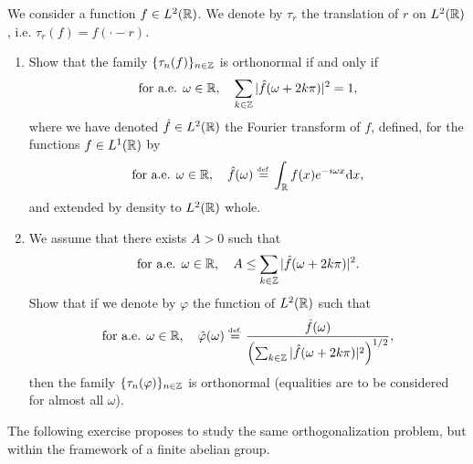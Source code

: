 \begin{exo}
\label{exo-series-fourier-orthogonalisation}

  We consider a function $ f \in L^2(\mathbb{R})$. We denote by $\tau_r $ the translation of $ r $ on $L^2(\mathbb{R})$, i.e. $\tau_r (f) = f(\cdot-r)$. \begin{enumerate}
\item Show that the family $\{\tau_n (f)\}_{n \in\mathbb{Z}}$ is orthonormal if and only if
\begin{equation*}
\text{for a.e. } \omega \in \mathbb{R}, \quad \sum_{k \in\mathbb{Z}}{|\hat{f}(\omega + 2k \pi) |^2} = 1,
\end{equation*}
where we have denoted $\hat{f} \in L^2(\mathbb{R})$ the Fourier transform of $f$, defined, for the functions $ f \in L^1(\mathbb{R})$ by
\begin{equation*}
\text{for a.e. } \omega \in \mathbb{R}, \quad \hat{f}(\omega) \stackrel{\mbox{\upshape\tiny def.}}{=} \int_{\mathbb{R}}{f (x) e^{- \imath \omega x} \mathrm{d} x},
\end{equation*}
and extended by density to $L^2(\mathbb{R})$ whole.
\item \label{notation-24} We assume that there exists $ A> 0 $ such that
\begin{equation*}
\text{for a.e. } \omega \in \mathbb{R}, \quad A \leq \sum_{k \in\mathbb{Z}}{|\hat{f}(\omega + 2k \pi) |^2}.
\end{equation*}
Show that if we denote by $\varphi $ the function of $L^2(\mathbb{R})$ such that
\begin{equation*}
\text{for a.e. } \omega \in \mathbb{R}, \quad \hat{\varphi}(\omega) \stackrel{\mbox{\upshape\tiny def.}}{=} \frac{\hat{f}(\omega)}{\left(\sum_{k \in\mathbb{Z}}{|\hat{f}(\omega + 2k \pi) |^2} \right)^{1/2}},
\end{equation*}
then the family $\{\tau_n(\varphi)\}_{n \in\mathbb{Z}}$ is orthonormal (equalities are to be considered for almost all $\omega $).
\end{enumerate} The following exercise  proposes to study the same orthogonalization problem, but within the framework of a finite abelian group.
\end{exo}

